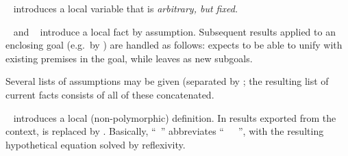 \begin{isabellebody}
\begin{isamarkuptext}
  \begin{description}
  
  \item \hyperlink{command.fix}{\mbox{}}~ introduces a local variable  that is \emph{arbitrary, but fixed.}
  
  \item \hyperlink{command.assume}{\mbox{}}~ and \hyperlink{command.presume}{\mbox{}}~ introduce a local fact  by
  assumption.  Subsequent results applied to an enclosing goal (e.g.\
  by \hyperlink{command.show}{\mbox{}}) are handled as follows: \hyperlink{command.assume}{\mbox{}} expects to be able to unify with existing premises in the
  goal, while \hyperlink{command.presume}{\mbox{\isa{\isacommand{presume}}}} leaves \isa{{\isaliteral{5C3C7068693E}{\isasymphi}}} as new subgoals.
  
  Several lists of assumptions may be given (separated by
  \hyperlink{keyword.and}{\mbox{}}; the resulting list of current facts consists
  of all of these concatenated.
  
  \item \hyperlink{command.def}{\mbox{}}~ introduces a local
  (non-polymorphic) definition.  In results exported from the context,
  \isa{x} is replaced by \isa{t}.  Basically, ``\hyperlink{command.def}{\mbox{}}~'' abbreviates ``\hyperlink{command.fix}{\mbox{}}~~\hyperlink{command.assume}{\mbox{}}~'', with the resulting
  hypothetical equation solved by reflexivity.
  

\end{description}
\end{isamarkuptext}
\end{isabellebody}
